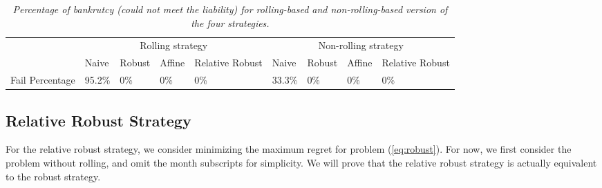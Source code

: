 \documentclass{article}
\begin{document}
    \begin{table}
        \label{table:regret}
        \centering
        \begin{tabular}{l|p{1.3cm}|p{1.3cm}|p{1.3cm}|p{1.3cm}|p{1.3cm}|p{1.3cm}|p{1.3cm}|p{1.3cm}|}
        \cline{2-9}
        & \multicolumn{4}{|c|}{Rolling strategy} & \multicolumn{4}{|c|}{Non-rolling strategy} \\
        \cline{2-9}
        & Naive & Robust & Affine & Relative Robust & Naive & Robust & Affine & Relative Robust \\ 
        \hline
        \multicolumn{1}{|c|}{Fail Percentage}  & 95.2\% & 0\% & 0\% & 0\% & 33.3\% & 0\% & 0\% & 0\%\\
        \hline
        \end{tabular}
        \caption{\emph{Percentage of bankrutcy (could not meet the liability) for rolling-based and non-rolling-based version of the four strategies.}}
    \end{table}


\subsection{Relative Robust Strategy}

    For the relative robust strategy, we consider minimizing the maximum regret for problem (\ref{eq:robust}). For now, we first consider the problem without rolling, and omit the month subscripts for simplicity. We will prove that the relative robust strategy is actually equivalent to the robust strategy.
\end{document}
